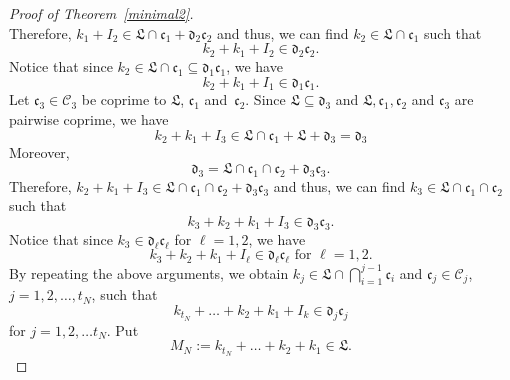\documentclass[leqno,a4paper,12pt]{article}
\theoremstyle{definition}
\begin{document}
\begin{proof}[Proof of Theorem~\ref{minimal2}]
\[\]
Therefore, $k_1+I_2\in \mathfrak{L}\cap\mathfrak{c}_1+\mathfrak{d}_2\mathfrak{c}_2$ and thus, we can find $k_2\in \mathfrak{L}\cap \mathfrak{c}_1$ such that
\[
k_2+k_1+I_2\in \mathfrak{d}_2\mathfrak{c}_2.
\]
Notice that since $k_2\in\mathfrak{L}\cap\mathfrak{c}_1\subseteq\mathfrak{d}_1\mathfrak{c}_1$, we have
\[
k_2+k_1+I_1\in\mathfrak{d}_1\mathfrak{c}_1.
\]
Let $\mathfrak{c}_3\in\mathcal{C}_3$ be coprime to $\mathfrak{L}$, $\mathfrak{c}_1$ and~$\mathfrak{c}_2$. Since
$\mathfrak{L}\subseteq \mathfrak{d}_3$ and $\mathfrak{L},\mathfrak{c}_1,\mathfrak{c}_2$ and $\mathfrak{c}_3$ are pairwise coprime, we have
\[
k_2+k_1+I_3\in \mathfrak{L}\cap \mathfrak{c}_1 + \mathfrak{L}+\mathfrak{d}_3=\mathfrak{d}_3
\]
Moreover,
\[
\mathfrak{d}_3=\mathfrak{L}\cap\mathfrak{c}_1\cap\mathfrak{c}_2+\mathfrak{d}_3\mathfrak{c}_3.
\]
Therefore, $k_2+k_1+I_3\in \mathfrak{L}\cap\mathfrak{c}_1\cap\mathfrak{c}_2+\mathfrak{d}_3\mathfrak{c}_3$ and thus, we can find $k_3\in\mathfrak{L}\cap\mathfrak{c}_1\cap\mathfrak{c}_2$ such that
\[
k_3+k_2+k_1+I_3\in\mathfrak{d}_3\mathfrak{c}_3.
\]
Notice that since $k_3\in\mathfrak{d}_\ell\mathfrak{c}_\ell$ for $\ell=1,2$, we have
\[
k_3+k_2+k_1+I_\ell\in\mathfrak{d}_\ell\mathfrak{c}_\ell\text{ for }\ell=1,2.
\]
By repeating the above arguments, we obtain $k_j\in\mathfrak{L}\cap\bigcap_{i=1}^{j-1}\mathfrak{c}_i$ and $\mathfrak{c}_j\in\mathcal{C}_j$, $j=1,2,\ldots,t_N$, such that
\begin{equation}\label{31}
k_{t_N}+\ldots+k_2+k_1+I_k\in\mathfrak{d}_j\mathfrak{c}_j
\end{equation}
for $j=1,2,\ldots t_N$. Put
\[
M_N:=k_{t_N}+\ldots+k_2+k_1\in\mathfrak{L}.
\]


\end{proof}
\end{document}
